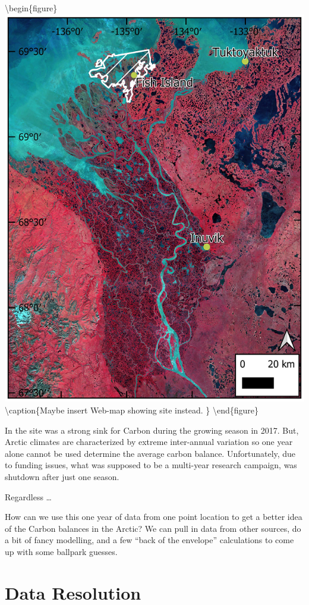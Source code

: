 \documentclass[
]{book}
\begin{document}
\textbackslash begin\{figure\}
\includegraphics[width=0.9\linewidth]{images/16-fig1} \textbackslash caption\{Maybe insert Web-map showing site instead. \citep{skeeter_controls_2022}\}\label{fig:16-fig1}
\textbackslash end\{figure\}

In the site was a strong sink for Carbon during the growing season in 2017. But, Arctic climates are characterized by extreme inter-annual variation so one year alone cannot be used determine the average carbon balance. Unfortunately, due to funding issues, what was supposed to be a multi-year research campaign, was shutdown after just one season.

Regardless \ldots{}

How can we use this one year of data from one point location to get a better idea of the Carbon balances in the Arctic? We can pull in data from other sources, do a bit of fancy modelling, and a few ``back of the envelope'' calculations to come up with some ballpark guesses.

\hypertarget{data-resolution}{%
\section{Data Resolution}\label{data-resolution}}
\end{document}
